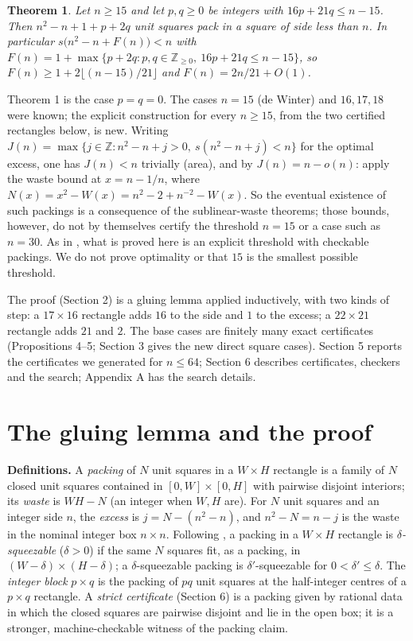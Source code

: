 \documentclass[11pt,letterpaper]{amsart}
\theoremstyle{plain}
\newtheorem{theorem}{Theorem}
\begin{document}
\begin{theorem}
Let $n \ge 15$ and let $p, q \ge 0$ be integers with $16p + 21q \le n - 15$. Then $n^2 - n + 1 + p + 2q$ unit squares pack in a square of side less than $n$. In particular $s\big(n^2 - n + F(n)\big) < n$ with $F(n) = 1 + \max\{p + 2q : p, q \in \mathbb{Z}_{\ge 0},\ 16p + 21q \le n - 15\}$, so $F(n) \ge 1 + 2\lfloor (n - 15)/21 \rfloor$ and $F(n) = 2n/21 + O(1)$.
\end{theorem}

Theorem 1 is the case $p = q = 0$. The cases $n = 15$ (de Winter) and $16, 17, 18$ \cite{AMS21} were known; the explicit construction for every $n \ge 15$, from the two certified rectangles below, is new. Writing $J(n) = \max\{j \in \mathbb{Z} : n^2 - n + j > 0,\ s(n^2 - n + j) < n\}$ for the optimal excess, one has $J(n) < n$ trivially (area), and by \cite{EG75} $J(n) = n - o(n)$: apply the waste bound at $x = n - 1/n$, where $N(x) = x^2 - W(x) = n^2 - 2 + n^{-2} - W(x)$. So the eventual existence of such packings is a consequence of the sublinear-waste theorems; those bounds, however, do not by themselves certify the threshold $n = 15$ or a case such as $n = 30$. As in \cite{AMS21}, what is proved here is an explicit threshold with checkable packings. We do not prove optimality or that $15$ is the smallest possible threshold.

The proof (Section 2) is a gluing lemma applied inductively, with two kinds of step: a $17 \times 16$ rectangle adds $16$ to the side and $1$ to the excess; a $22 \times 21$ rectangle adds $21$ and $2$. The base cases are finitely many exact certificates (Propositions 4--5; Section 3 gives the new direct square cases). Section 5 reports the certificates we generated for $n \le 64$; Section 6 describes certificates, checkers and the search; Appendix A has the search details.

\section{The gluing lemma and the proof}

\textbf{Definitions.} A \emph{packing} of $N$ unit squares in a $W \times H$ rectangle is a family of $N$ closed unit squares contained in $[0, W] \times [0, H]$ with pairwise disjoint interiors; its \emph{waste} is $WH - N$ (an integer when $W, H$ are). For $N$ unit squares and an integer side $n$, the \emph{excess} is $j = N - (n^2 - n)$, and $n^2 - N = n - j$ is the waste in the nominal integer box $n \times n$. Following \cite{AMS21}, a packing in a $W \times H$ rectangle is \emph{$\delta$-squeezable} ($\delta > 0$) if the same $N$ squares fit, as a packing, in $(W - \delta) \times (H - \delta)$; a $\delta$-squeezable packing is $\delta'$-squeezable for $0 < \delta' \le \delta$. The \emph{integer block} $p \times q$ is the packing of $pq$ unit squares at the half-integer centres of a $p \times q$ rectangle. A \emph{strict certificate} (Section 6) is a packing given by rational data in which the closed squares are pairwise disjoint and lie in the open box; it is a stronger, machine-checkable witness of the packing claim.
\end{document}
